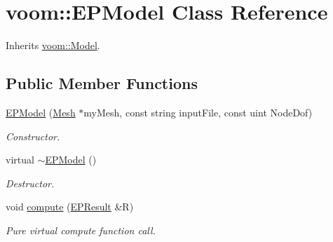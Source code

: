 \hypertarget{classvoom_1_1_e_p_model}{
\section{voom::EPModel Class Reference}
\label{classvoom_1_1_e_p_model}
}


Inherits \hyperlink{classvoom_1_1_model}{voom::Model}.\subsection*{Public Member Functions}
\begin{DoxyCompactItemize}
\item 
\hypertarget{classvoom_1_1_e_p_model_a4f801fc07406ca8bbb0fecec1a0f8600}{
\hyperlink{classvoom_1_1_e_p_model_a4f801fc07406ca8bbb0fecec1a0f8600}{EPModel} (\hyperlink{classvoom_1_1_mesh}{Mesh} $\ast$myMesh, const string inputFile, const uint NodeDof)}
\label{classvoom_1_1_e_p_model_a4f801fc07406ca8bbb0fecec1a0f8600}

\begin{DoxyCompactList}\small\item\em Constructor. \item\end{DoxyCompactList}\item 
\hypertarget{classvoom_1_1_e_p_model_abea9961b1124d6f085f468f689fa17f7}{
virtual \hyperlink{classvoom_1_1_e_p_model_abea9961b1124d6f085f468f689fa17f7}{$\sim$EPModel} ()}
\label{classvoom_1_1_e_p_model_abea9961b1124d6f085f468f689fa17f7}

\begin{DoxyCompactList}\small\item\em Destructor. \item\end{DoxyCompactList}\item 
\hypertarget{classvoom_1_1_e_p_model_a22be08f54a6867e9ac632f394c022947}{
void \hyperlink{classvoom_1_1_e_p_model_a22be08f54a6867e9ac632f394c022947}{compute} (\hyperlink{structvoom_1_1_e_p_result}{EPResult} \&R)}
\label{classvoom_1_1_e_p_model_a22be08f54a6867e9ac632f394c022947}

\begin{DoxyCompactList}\small\item\em Pure virtual compute function call. \item\end{DoxyCompactList}\end{DoxyCompactItemize}
